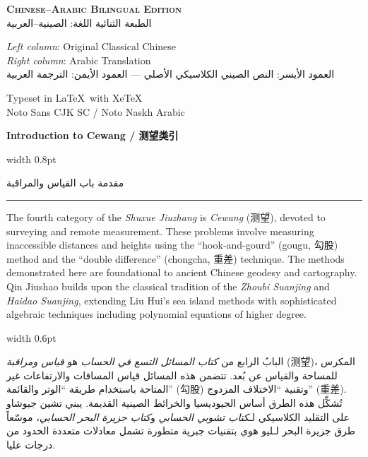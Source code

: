 \documentclass[11pt,a4paper]{article}
\newlength{\cnwidth}
\newlength{\arwidth}
\newcommand{\paralleltext}[2]{%
  \par\medskip\noindent
  \begin{minipage}[t]{\cnwidth}%
    \small #1%
  \end{minipage}%
  \hfill\textcolor{colrule}{\vrule width 0.6pt}\hfill
  \begin{minipage}[t]{\arwidth}%
    \small\arabicfont\beginR #2\endR%
  \end{minipage}%
  \par\medskip
}
\newcommand{\parallelsection}[2]{%
  \par\bigskip\noindent
  \begin{minipage}[t]{\cnwidth}%
    \Large\bfseries\color{sectioncolor} #1%
  \end{minipage}%
  \hfill\textcolor{colrule}{\vrule width 0.8pt}\hfill
  \begin{minipage}[t]{\arwidth}%
    \Large\arabicfontbf\color{sectioncolor}\beginR #2\endR%
  \end{minipage}%
  \par\medskip\noindent\textcolor{colrule}{\rule{\textwidth}{0.6pt}}\par\medskip
}
\begin{document}
\begin{titlepage}
\vspace{0.5cm}

{\normalsize\textbf{\textsc{Chinese--Arabic Bilingual Edition}}\\[0.2em]
\arabicfont\beginR الطبعة الثنائية اللغة: الصينية--العربية\endR}

\vspace{0.5cm}

{\small
\textit{Left column}: Original Classical Chinese\\
\textit{Right column}: Arabic Translation\\[0.2em]
\arabicfont\beginR العمود الأيسر: النص الصيني الكلاسيكي الأصلي --- العمود الأيمن: الترجمة العربية\endR
}

\vfill

{\small Typeset in \LaTeX\ with XeTeX\\
Noto Sans CJK SC / Noto Naskh Arabic}

\end{titlepage}

\newpage
\tableofcontents
\newpage

\parallelsection{Introduction to Cewang / 测望类引}{مقدمة باب القياس والمراقبة}

\paralleltext{%
The fourth category of the \textit{Shuxue Jiuzhang} is \textit{Cewang} (测望), devoted to surveying and remote measurement. These problems involve measuring inaccessible distances and heights using the ``hook-and-gourd'' (gougu, 勾股) method and the ``double difference'' (chongcha, 重差) technique. The methods demonstrated here are foundational to ancient Chinese geodesy and cartography. Qin Jiushao builds upon the classical tradition of the \textit{Zhoubi Suanjing} and \textit{Haidao Suanjing}, extending Liu Hui's sea island methods with sophisticated algebraic techniques including polynomial equations of higher degree.
}{%
البابُ الرابع من \textit{كتاب المسائل التسع في الحساب} هو \textit{قياس ومراقبة} (测望)، المكرس للمساحة والقياس عن بُعد. تتضمن هذه المسائل قياس المسافات والارتفاعات غير المتاحة باستخدام طريقة ``الوتر والقائمة'' (勾股) وتقنية ``الاختلاف المزدوج'' (重差). تُشكِّل هذه الطرق أساس الجيوديسيا والخرائط الصينية القديمة. يبني تشين جيوشاو على التقليد الكلاسيكي لـ\textit{كتاب تشوبي الحسابي} و\textit{كتاب جزيرة البحر الحسابي}، موسّعاً طرق جزيرة البحر لـليو هوي بتقنيات جبرية متطورة تشمل معادلات متعددة الحدود من درجات عليا.
}
\end{document}

